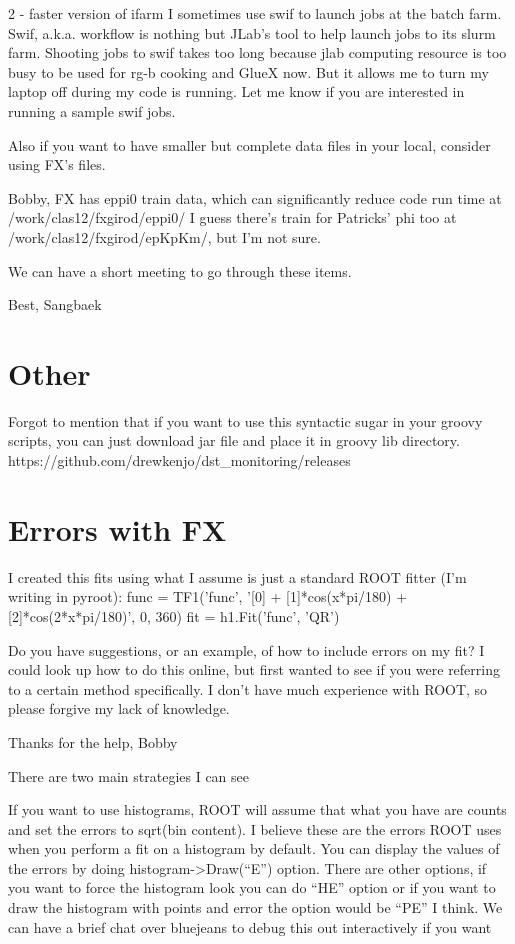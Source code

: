     2 - faster version of ifarm
    I sometimes use swif to launch jobs at the batch farm. Swif, a.k.a. workflow is nothing but JLab's tool to help launch jobs to its slurm farm. Shooting jobs to swif takes too long because jlab computing resource is too busy to be used for rg-b cooking and GlueX now. But it allows me to turn my laptop off during my code is running. Let me know if you are interested in running a sample swif jobs.
    
    Also if you want to have smaller but complete data files in your local, consider using FX's files.
    
    Bobby, FX has eppi0 train data, which can significantly reduce code run time at /work/clas12/fxgirod/eppi0/
    I guess there’s train for Patricks’ phi too at /work/clas12/fxgirod/epKpKm/, but I’m not sure.
    
    We can have a short meeting to go through these items.
    
    Best,
    Sangbaek
    
    
    
\section{Other}
Forgot to mention that if you want to use this syntactic sugar in your groovy scripts, you can just download jar file and place it in groovy lib directory.
https://github.com/drewkenjo/dst_monitoring/releases



\section{Errors with FX}
I created this fits using what I assume is just a standard ROOT fitter (I'm writing in pyroot):
func = TF1('func', '[0] + [1]*cos(x*pi/180) + [2]*cos(2*x*pi/180)', 0, 360)
 fit = h1.Fit('func', 'QR')

Do you have suggestions, or an example, of how to include errors on my fit? I could look up how to do this online, but first wanted to see if you were referring to a certain method specifically. I don't have much experience with ROOT, so please forgive my lack of knowledge. 

Thanks for the help,
Bobby 

There are two main strategies I can see

If you want to use histograms, ROOT will assume that what you have are counts and set the errors to sqrt(bin content). I believe these are the errors ROOT uses when you perform a fit on a histogram by default. You can display the values of the errors by doing histogram->Draw(“E”) option. There are other options, if you want to force the histogram look you can do “HE” option or if you want to draw the histogram with points and error the option would be “PE” I think. We can have a brief chat over bluejeans to debug this out interactively if you want

